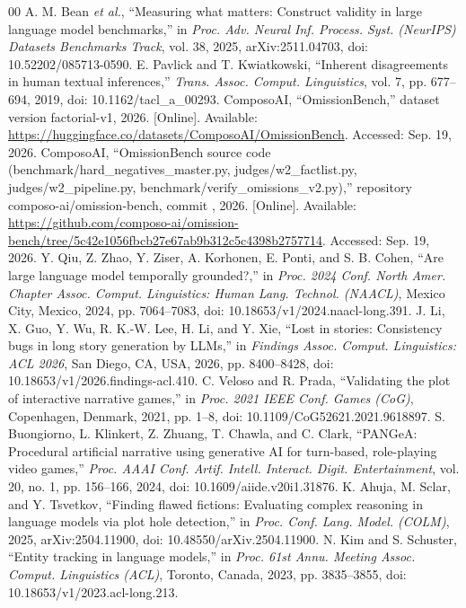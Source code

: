 \documentclass{ieeeaccess}
\begin{document}
\begin{thebibliography}{00}
 A. M. Bean \emph{et al.}, ``Measuring what matters: Construct validity in large language model benchmarks,'' in \emph{Proc. Adv. Neural Inf. Process. Syst. (NeurIPS) Datasets Benchmarks Track}, vol. 38, 2025, arXiv:2511.04703, doi: 10.52202/085713-0590.
 E. Pavlick and T. Kwiatkowski, ``Inherent disagreements in human textual inferences,'' \emph{Trans. Assoc. Comput. Linguistics}, vol. 7, pp. 677--694, 2019, doi: 10.1162/tacl\_a\_00293.
 ComposoAI, ``OmissionBench,'' dataset version factorial-v1, 2026. [Online]. Available: \url{https://huggingface.co/datasets/ComposoAI/OmissionBench}. Accessed: Sep. 19, 2026.
 ComposoAI, ``OmissionBench source code (benchmark/hard\_negatives\_master.py, judges/w2\_factlist.py, judges/w2\_pipeline.py, benchmark/verify\_omissions\_v2.py),'' repository composo-ai/omission-bench, commit , 2026. [Online]. Available: \url{https://github.com/composo-ai/omission-bench/tree/5c42e1056fbcb27e67ab9b312c5c4398b2757714}. Accessed: Sep. 19, 2026.
 Y. Qiu, Z. Zhao, Y. Ziser, A. Korhonen, E. Ponti, and S. B. Cohen, ``Are large language model temporally grounded?,'' in \emph{Proc. 2024 Conf. North Amer. Chapter Assoc. Comput. Linguistics: Human Lang. Technol. (NAACL)}, Mexico City, Mexico, 2024, pp. 7064--7083, doi: 10.18653/v1/2024.naacl-long.391.
 J. Li, X. Guo, Y. Wu, R. K.-W. Lee, H. Li, and Y. Xie, ``Lost in stories: Consistency bugs in long story generation by LLMs,'' in \emph{Findings Assoc. Comput. Linguistics: ACL 2026}, San Diego, CA, USA, 2026, pp. 8400--8428, doi: 10.18653/v1/2026.findings-acl.410.
 C. Veloso and R. Prada, ``Validating the plot of interactive narrative games,'' in \emph{Proc. 2021 IEEE Conf. Games (CoG)}, Copenhagen, Denmark, 2021, pp. 1--8, doi: 10.1109/CoG52621.2021.9618897.
 S. Buongiorno, L. Klinkert, Z. Zhuang, T. Chawla, and C. Clark, ``PANGeA: Procedural artificial narrative using generative AI for turn-based, role-playing video games,'' \emph{Proc. AAAI Conf. Artif. Intell. Interact. Digit. Entertainment}, vol. 20, no. 1, pp. 156--166, 2024, doi: 10.1609/aiide.v20i1.31876.
 K. Ahuja, M. Sclar, and Y. Tsvetkov, ``Finding flawed fictions: Evaluating complex reasoning in language models via plot hole detection,'' in \emph{Proc. Conf. Lang. Model. (COLM)}, 2025, arXiv:2504.11900, doi: 10.48550/arXiv.2504.11900.
 N. Kim and S. Schuster, ``Entity tracking in language models,'' in \emph{Proc. 61st Annu. Meeting Assoc. Comput. Linguistics (ACL)}, Toronto, Canada, 2023, pp. 3835--3855, doi: 10.18653/v1/2023.acl-long.213.

\end{thebibliography}
\end{document}

